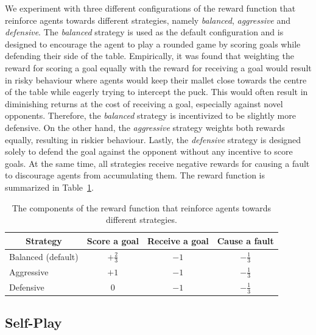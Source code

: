 \documentclass{article}
\begin{document}
We experiment with three different configurations of the reward function that reinforce agents towards different strategies, namely \textit{balanced}, \textit{aggressive} and \textit{defensive}. The \textit{balanced} strategy is used as the default configuration and is designed to encourage the agent to play a rounded game by scoring goals while defending their side of the table. Empirically, it was found that weighting the reward for scoring a goal equally with the reward for receiving a goal would result in risky behaviour where agents would keep their mallet close towards the centre of the table while eagerly trying to intercept the puck. This would often result in diminishing returns at the cost of receiving a goal, especially against novel opponents. Therefore, the \textit{balanced} strategy is incentivized to be slightly more defensive. On the other hand, the \textit{aggressive} strategy weights both rewards equally, resulting in riskier behaviour. Lastly, the \textit{defensive} strategy is designed solely to defend the goal against the opponent without any incentive to score goals. At the same time, all strategies receive negative rewards for causing a fault to discourage agents from accumulating them. The reward function is summarized in Table~\ref{tab:reward-function}.

\begin{table}[ht]
    \caption{The components of the reward function that reinforce agents towards different strategies.}
    \label{tab:reward-function}
    \centering
    \begin{tabular}{lccc}
        \toprule
        \multicolumn{1}{c}{Strategy} & Score a goal                     & Receive a goal & Cause a fault    \\
        \midrule
        Balanced (default)           & \hspace{-0.75pt}\(+\frac{2}{3}\) & \(-1\)         & \(-\frac{1}{3}\) \\[2pt]
        Aggressive                   & \hspace{-2.0pt}\(+1\)            & \(-1\)         & \(-\frac{1}{3}\) \\[2pt]
        Defensive                    & \(0\)                            & \(-1\)         & \(-\frac{1}{3}\) \\
        \bottomrule
    \end{tabular}
\end{table}

\subsection{Self-Play}\label{ssec:self-play}
\end{document}
